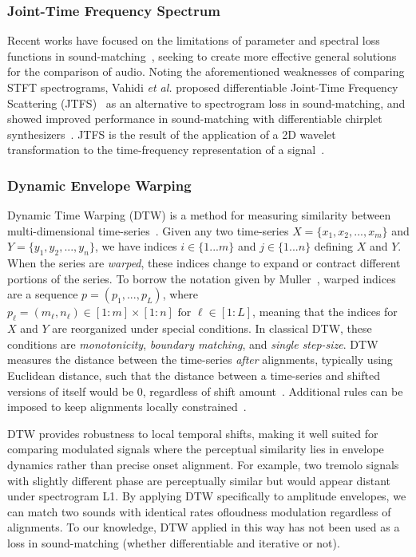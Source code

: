 \subsubsection{Joint-Time Frequency Spectrum}
Recent works have focused on the limitations of parameter and spectral loss functions in sound-matching~\cite{vahidi2023mesostructures,uzrad2024diffmoog}, seeking to create more effective general solutions for the comparison of audio. 
Noting the aforementioned weaknesses of comparing STFT spectrograms, Vahidi \textit{et al.} proposed differentiable Joint-Time Frequency Scattering (\gls{JTFS})~\cite{anden2015joint} as an alternative to spectrogram loss in sound-matching, and showed improved performance in sound-matching with differentiable chirplet synthesizers~\cite{vahidi2023mesostructures}. JTFS is the result of the application of a 2D wavelet transformation to the time-frequency representation of a signal~\cite{anden2015joint}. 

\subsubsection{Dynamic Envelope Warping}
Dynamic Time Warping (DTW) is a method for measuring similarity between multi-dimensional time-series~\cite{rabiner1993fundamentals,muller2007dynamic,giorgino2009computing}. Given any two time-series $X = \{x_1,x_2,...,x_m\}$ and $Y = \{y_1,y_2,...,y_n\}$, we have indices $i\in\{1...m\}$ and $j\in\{1...n\}$ defining $X$ and $Y$. When the series are \textit{warped}, these indices change to expand or contract different portions of the series. To borrow the notation given by Muller~\cite{muller2007dynamic}, warped indices are a sequence $p=(p_1,...,p_L)$, where \(p_\ell = (m_\ell, n_\ell) \in [1 : m] \times [1 : n] \text{ for } \ell \in [1 : L]\), meaning that the indices for $X$ and $Y$ are reorganized under special conditions. In classical DTW, these conditions are \textit{monotonicity}, \textit{boundary matching}, and \textit{single step-size}. DTW measures the distance between the time-series \textit{after} alignments, typically using Euclidean distance, such that the distance between a time-series and shifted versions of itself would be 0, regardless of shift amount~\cite{tavenard.blog.dtw}. Additional rules can be imposed to keep alignments locally constrained~\cite{itakura1975minimum,sakoe1978dynamic}.

DTW provides robustness to local temporal shifts, making it well suited for comparing modulated signals where the perceptual similarity lies in envelope dynamics rather than precise onset alignment. 
For example, two tremolo signals with slightly different phase are perceptually similar but would appear distant under spectrogram L1. 
By applying DTW specifically to amplitude envelopes, we can match two sounds with identical rates ofloudness modulation regardless of alignments. 
To our knowledge, DTW applied in this way has not been used as a loss in sound-matching (whether differentiable and iterative or not).


